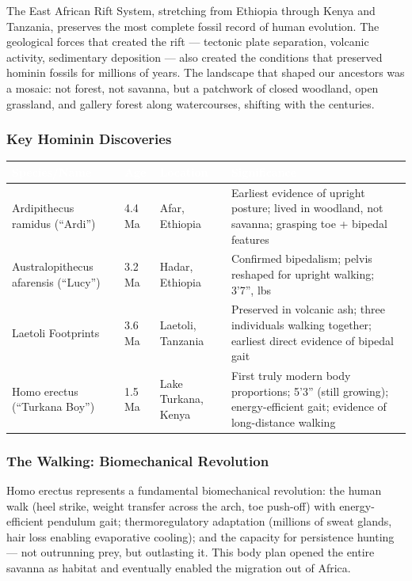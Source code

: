 \documentclass[11pt,letterpaper]{article}
\newcommand{\tableheader}[1]{\textbf{\sffamily\textcolor{white}{#1}}}
\begin{document}
The East African Rift System, stretching from Ethiopia through Kenya and Tanzania, preserves the most complete fossil record of human evolution. The geological forces that created the rift --- tectonic plate separation, volcanic activity, sedimentary deposition --- also created the conditions that preserved hominin fossils for millions of years. The landscape that shaped our ancestors was a mosaic: not forest, not savanna, but a patchwork of closed woodland, open grassland, and gallery forest along watercourses, shifting with the centuries.

\subsubsection{Key Hominin Discoveries}

\begin{center}
\begin{tabularx}{\textwidth}{L{3cm}C{1.5cm}L{2.5cm}X}
\toprule
{}
\tableheader{Species/Name} & \tableheader{Age} & \tableheader{Location} & \tableheader{Significance} \\
\midrule
Ardipithecus ramidus (``Ardi'') & 4.4 Ma & Afar, Ethiopia & Earliest evidence of upright posture; lived in woodland, not savanna; grasping toe + bipedal features \\
Australopithecus afarensis (``Lucy'') & 3.2 Ma & Hadar, Ethiopia & Confirmed bipedalism; pelvis reshaped for upright walking; 3'7'',  lbs \\
Laetoli Footprints & 3.6 Ma & Laetoli, Tanzania & Preserved in volcanic ash; three individuals walking together; earliest direct evidence of bipedal gait \\
Homo erectus (``Turkana Boy'') & 1.5 Ma & Lake Turkana, Kenya & First truly modern body proportions; 5'3'' (still growing); energy-efficient gait; evidence of long-distance walking \\
\bottomrule
\end{tabularx}
\end{center}

\subsubsection{The Walking: Biomechanical Revolution}

Homo erectus represents a fundamental biomechanical revolution: the human walk (heel strike, weight transfer across the arch, toe push-off) with energy-efficient pendulum gait; thermoregulatory adaptation (millions of sweat glands, hair loss enabling evaporative cooling); and the capacity for persistence hunting --- not outrunning prey, but outlasting it. This body plan opened the entire savanna as habitat and eventually enabled the migration out of Africa.
\end{document}
